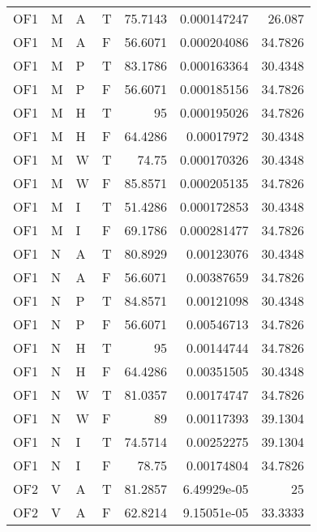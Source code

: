 \begin{longtable}{llllrrr}
    OF1      & M     & A     & T          & 75.7143    & 0.000147247 & 26.087   \\
    OF1      & M     & A     & F          & 56.6071    & 0.000204086 & 34.7826  \\
    OF1      & M     & P     & T          & 83.1786    & 0.000163364 & 30.4348  \\
    OF1      & M     & P     & F          & 56.6071    & 0.000185156 & 34.7826  \\
    OF1      & M     & H     & T          & 95         & 0.000195026 & 34.7826  \\
    OF1      & M     & H     & F          & 64.4286    & 0.00017972  & 30.4348  \\
    OF1      & M     & W     & T          & 74.75      & 0.000170326 & 30.4348  \\
    OF1      & M     & W     & F          & 85.8571    & 0.000205135 & 34.7826  \\
    OF1      & M     & I     & T          & 51.4286    & 0.000172853 & 30.4348  \\
    OF1      & M     & I     & F          & 69.1786    & 0.000281477 & 34.7826  \\
    OF1      & N     & A     & T          & 80.8929    & 0.00123076  & 30.4348  \\
    OF1      & N     & A     & F          & 56.6071    & 0.00387659  & 34.7826  \\
    OF1      & N     & P     & T          & 84.8571    & 0.00121098  & 30.4348  \\
    OF1      & N     & P     & F          & 56.6071    & 0.00546713  & 34.7826  \\
    OF1      & N     & H     & T          & 95         & 0.00144744  & 34.7826  \\
    OF1      & N     & H     & F          & 64.4286    & 0.00351505  & 30.4348  \\
    OF1      & N     & W     & T          & 81.0357    & 0.00174747  & 34.7826  \\
    OF1      & N     & W     & F          & 89         & 0.00117393  & 39.1304  \\
    OF1      & N     & I     & T          & 74.5714    & 0.00252275  & 39.1304  \\
    OF1      & N     & I     & F          & 78.75      & 0.00174804  & 34.7826  \\
    OF2      & V     & A     & T          & 81.2857    & 6.49929e-05 & 25       \\
    OF2      & V     & A     & F          & 62.8214    & 9.15051e-05 & 33.3333  \\

\end{longtable}
